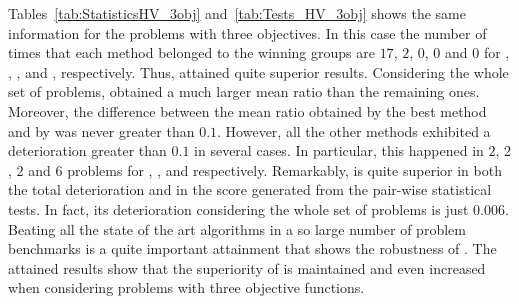 



Tables~\ref{tab:StatisticsHV_3obj} and~\ref{tab:Tests_HV_3obj} shows the same information for the problems with three objectives.
%
In this case the number of times that each method belonged to the winning groups are $17$, $2$, $0$, $0$ and $0$ 
for \AVSDMOEAD{}, \RMOEA{}, \MOEADDE{}, \NSGAIII{} and \NSGAII{}, respectively.
%
Thus, \AVSDMOEAD{} attained quite superior results.
%
Considering the whole set of problems, \AVSDMOEAD{} obtained a much larger mean \HV{} ratio than the remaining ones.
%
Moreover, the difference between the mean \HV{} ratio obtained by the best method and by \AVSDMOEAD{} was never greater than $0.1$.
%
However, all the other methods exhibited a deterioration greater than $0.1$ in several cases.
%
In particular, this happened in $2$, $2$, $2$ and $6$ problems for \MOEADDE{}, \RMOEA{}, \NSGAIII{} and \NSGAII{} respectively.
%
Remarkably, \AVSDMOEAD{} is quite superior in both the total deterioration and in the score generated from the pair-wise
statistical tests.
%
In fact, its deterioration considering the whole set of problems is just $0.006$.
%
Beating all the state of the art algorithms in a so large number of problem benchmarks is a quite important attainment that shows
the robustness of \AVSDMOEAD{}.
%
%
The attained results show that the superiority of \AVSDMOEAD{} is maintained and even increased when considering 
problems with three objective functions.
%
%
%
%



